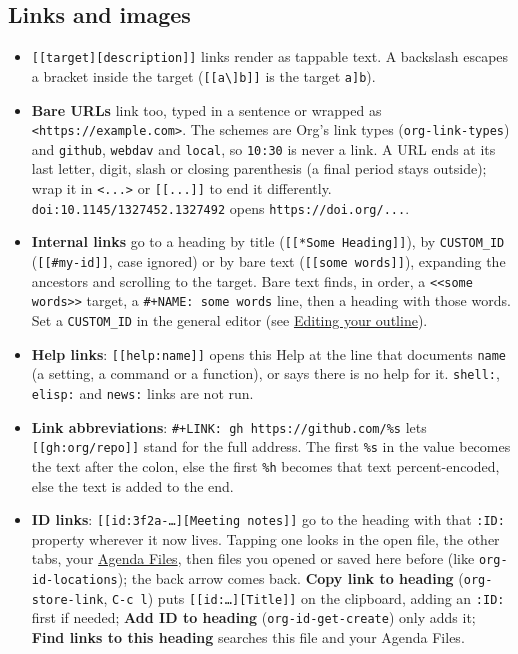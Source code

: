 \documentclass[11pt]{article}
\begin{document}
\subsection{Links and images}
\label{sec:org9659c7e}
\begin{itemize}
\item \texttt{[[target][description]]} links render as tappable text. A backslash escapes a bracket inside the target (\texttt{[[a\textbackslash{}]b]]} is the target \texttt{a]b}).
\item \textbf{Bare URLs} link too, typed in a sentence or wrapped as \texttt{<https://example.com>}. The schemes are Org's link types (\texttt{org-link-types}) and \texttt{github}, \texttt{webdav} and \texttt{local}, so \texttt{10:30} is never a link. A URL ends at its last letter, digit, slash or closing parenthesis (a final period stays outside); wrap it in \texttt{<...>} or \texttt{[[...]]} to end it differently. \texttt{doi:10.1145/1327452.1327492} opens \texttt{https://doi.org/...}.
\item \textbf{Internal links} go to a heading by title (\texttt{[[*Some Heading]]}), by \texttt{CUSTOM\_ID} (\texttt{[[\#my-id]]}, case ignored) or by bare text (\texttt{[[some words]]}), expanding the ancestors and scrolling to the target. Bare text finds, in order, a \texttt{<{}<{}some words>{}>{}} target, a \texttt{\#+NAME: some words} line, then a heading with those words. Set a \texttt{CUSTOM\_ID} in the general editor (see \hyperref[sec:org1979749]{Editing your outline}).
\item \textbf{Help links}: \texttt{[[help:name]]} opens this Help at the line that documents \texttt{name} (a setting, a command or a function), or says there is no help for it. \texttt{shell:}, \texttt{elisp:} and \texttt{news:} links are not run.
\item \textbf{Link abbreviations}: \texttt{\#+LINK: gh https://github.com/\%s} lets \texttt{[[gh:org/repo]]} stand for the full address. The first \texttt{\%s} in the value becomes the text after the colon, else the first \texttt{\%h} becomes that text percent-encoded, else the text is added to the end.
\item \textbf{ID links}: \texttt{[[id:3f2a-…][Meeting notes]]} go to the heading with that \texttt{:ID:} property wherever it now lives. Tapping one looks in the open file, the other tabs, your \hyperref[sec:org4d24003]{Agenda Files}, then files you opened or saved here before (like \texttt{org-id-locations}); the back arrow comes back. \textbf{Copy link to heading} (\texttt{org-store-link}, \texttt{C-c l}) puts \texttt{[[id:…][Title]]} on the clipboard, adding an \texttt{:ID:} first if needed; \textbf{Add ID to heading} (\texttt{org-id-get-create}) only adds it; \textbf{Find links to this heading} searches this file and your Agenda Files.

\end{itemize}
\end{document}
